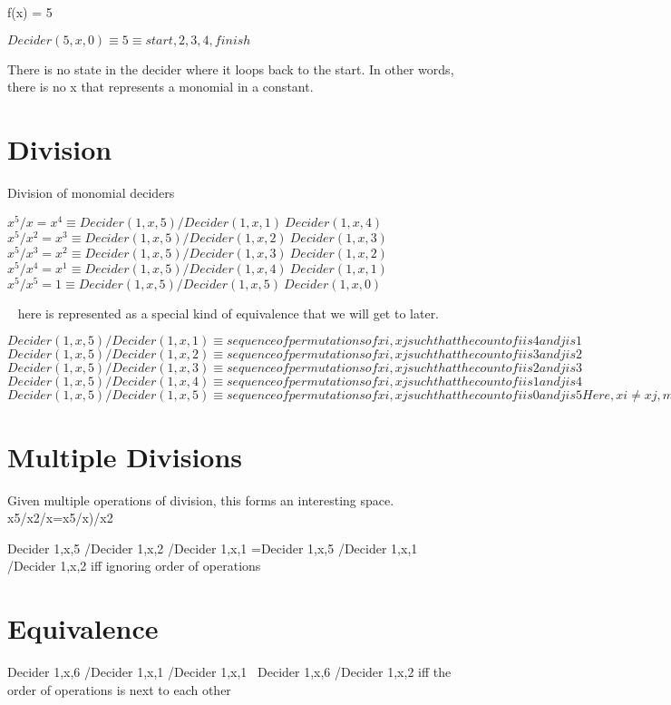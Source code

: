 f(x) = 5

$Decider(5,x,0) \equiv 5 \equiv {start,2,3,4,finish}$

There is no state in the decider where it loops back to the start. In other words, there is no x that represents a monomial in a constant.

\section{Division}

Division of monomial deciders


$x^5 / x = x^4 \equiv Decider(1,x,5)/Decider(1,x,1) ~ Decider(1,x,4)$
$x^5 / x^2 = x^3 \equiv Decider(1,x,5)/Decider(1,x,2) ~ Decider(1,x,3)$
$x^5 / x^3 = x^2 \equiv Decider(1,x,5)/Decider(1,x,3) ~ Decider(1,x,2)$
$x^5 / x^4 = x^1 \equiv Decider(1,x,5)/Decider(1,x,4) ~ Decider(1,x,1)$
$x^5 / x^5 = 1 \equiv Decider(1,x,5)/Decider(1,x,5) ~ Decider(1,x,0)$

~ here is represented as a special kind of equivalence that we will get to later.

$Decider(1,x,5)/Decider(1,x,1) \equiv
 {sequence of permutations of {xi,xj} such that the count of i is 4 and j is 1}$
$Decider(1,x,5)/Decider(1,x,2) \equiv
 {sequence of permutations of {xi,xj} such that the count of i is 3 and j is 2}$
$Decider(1,x,5)/Decider(1,x,3) \equiv
 {sequence of permutations of {xi,xj} such that the count of i is 2 and j is 3}$
$Decider(1,x,5)/Decider(1,x,4) \equiv
 {sequence of permutations of {xi,xj} such that the count of i is 1 and j is 4}$
$Decider(1,x,5)/Decider(1,x,5) \equiv
 {sequence of permutations of {xi,xj} such that the count of i is 0 and j is 5} Here, xi \neq
 xj, meaning xi is of a different representation than xj$

\section{Multiple Divisions}

Given multiple operations of division, this forms an interesting space.
x5/x2/x=x5/x)/x2

Decider 1,x,5 /Decider 1,x,2 /Decider 1,x,1 =Decider 1,x,5 /Decider 1,x,1 /Decider 1,x,2
 iff ignoring order of operations
 
\section{Equivalence}

Decider 1,x,6 /Decider 1,x,1 /Decider 1,x,1 ~Decider 1,x,6 /Decider 1,x,2
  iff the order of operations is next to each other

